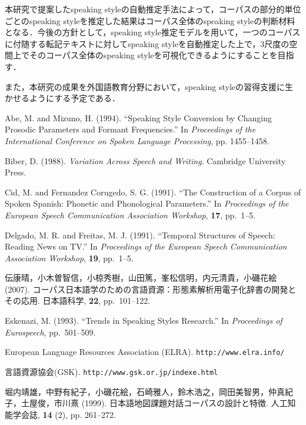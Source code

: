 \documentclass[japanese]{jnlp_1.4}
\begin{document}
本研究で提案したspeaking styleの自動推定手法によって，コーパスの部分的単位ごとのspeaking styleを推定した結果はコーパス全体のspeaking styleの判断材料となる．今後の方針として，speaking style推定モデルを用いて，一つのコーパスに付随する転記テキストに対してspeaking styleを自動推定した上で，3尺度の空間上でそのコーパス全体のspeaking styleを可視化できるようにすることを目指す．

また，本研究の成果を外国語教育分野において，speaking styleの習得支援に生かせるようにする予定である．


\begin{thebibliography}{}

\item
Abe, M. and Mizuno, H. (1994). ``Speaking Style Conversion by Changing Prosodic Parameters and Formant Frequencies.'' In \textit{Proceedings of the International Conference on Spoken Language Processing}, pp. 1455--1458.

\item
Biber, D. (1988). \textit{Variation Across Speech and Writing}. Cambridge University Press.

\item
Cid, M. and Fernandez Corugedo, S. G. (1991). ``The Construction of a Corpus of Spoken Spanish: Phonetic and Phonological Parameters.'' In \textit{Proceedings of the European Speech Communication Association Workshop}, \textbf{17}, pp.~1--5.

\item
Delgado, M. R. and Freitas, M. J. (1991). ``Temporal Structures of Speech: Reading News on TV.'' In \textit{Proceedings of the European Speech Communication Association Workshop}, \textbf{19}, pp.~1--5.

\item
伝康晴，小木曽智信，小椋秀樹，山田篤，峯松信明，内元清貴，小磯花絵 (2007). コーパス日本語学のための言語資源：形態素解析用電子化辞書の開発とその応用. 日本語科学, \textbf{22}, pp.~101--122.

\item
Eskenazi, M. (1993). ``Trends in Speaking Styles Research.'' In \textit{Proceedings of Eurospeech}, pp.~501--509.

\item
European Language Resources Association (ELRA). \texttt{http://www.elra.info/}

\item
言語資源協会(GSK). \texttt{http://www.gsk.or.jp/index\textunderscore e.html}

\item
堀内靖雄，中野有紀子，小磯花絵，石崎雅人，鈴木浩之，岡田美智男，仲真紀子，土屋俊，市川熹 (1999). 日本語地図課題対話コーパスの設計と特徴. 人工知能学会誌, \textbf{14} (2), pp. 261--272.


\end{thebibliography}
\end{document}
